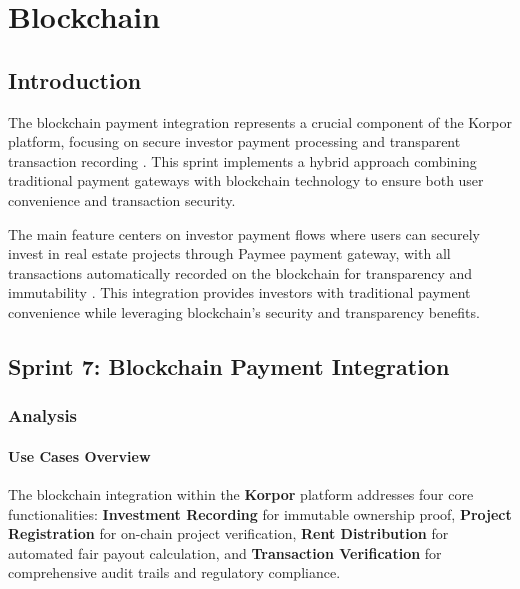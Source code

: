 \chapter{Blockchain}


\section*{Introduction}

The blockchain payment integration represents a crucial component of the Korpor platform, focusing on secure investor payment processing and transparent transaction recording \cite{Nakamoto2008Bitcoin}. This sprint implements a hybrid approach combining traditional payment gateways with blockchain technology to ensure both user convenience and transaction security.

The main feature centers on investor payment flows where users can securely invest in real estate projects through Paymee payment gateway, with all transactions automatically recorded on the blockchain for transparency and immutability \cite{Tapscott2016Blockchain}. This integration provides investors with traditional payment convenience while leveraging blockchain's security and transparency benefits.

\section{Sprint 7: Blockchain Payment Integration}

\subsection{Analysis}
\subsubsection{Use Cases Overview}

The blockchain integration within the \textbf{\textcolor{primary}{Korpor}} platform addresses four core functionalities: \textbf{Investment Recording} for immutable ownership proof, \textbf{Project Registration} for on-chain project verification, \textbf{Rent Distribution} for automated fair payout calculation, and \textbf{Transaction Verification} for comprehensive audit trails and regulatory compliance.

